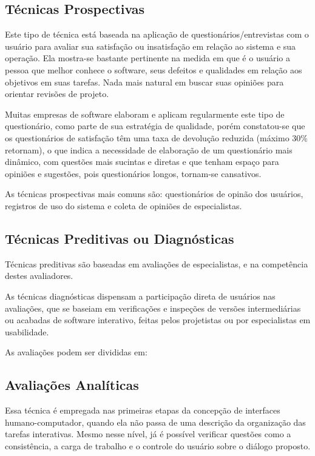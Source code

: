 \subsection{Técnicas Prospectivas}

Este tipo de técnica está baseada na aplicação de questionários/entrevistas com o usuário para avaliar sua satisfação ou insatisfação em relação ao sistema e sua operação. Ela mostra-se bastante pertinente na medida em que é o usuário a pessoa que melhor conhece o software, seus defeitos e qualidades em relação aos objetivos em suas tarefas. Nada mais natural em buscar suas opiniões para orientar revisões de projeto.

Muitas empresas de software elaboram e aplicam regularmente este tipo de questionário, como parte de sua estratégia de qualidade, porém constatou-se que os questionários de satisfação têm uma taxa de devolução reduzida (máximo 30\% retornam), o que indica a necessidade de elaboração de um questionário mais dinâmico, com questões mais sucintas e diretas e que tenham espaço para opiniões e sugestões, pois questionários longos, tornam-se cansativos.
\cite{cybil_apostila}

As técnicas prospectivas mais comuns são: questionários de opinão dos usuários, registros de uso do sistema e coleta de opiniões de especialistas. 

\subsection{Técnicas Preditivas ou Diagnósticas}

Técnicas preditivas são baseadas em avaliações de especialistas, e na competência destes avaliadores. 

As técnicas diagnósticas dispensam a participação direta de usuários nas avaliações, que se baseiam em verificações e inspeções de versões intermediárias ou acabadas de software interativo, feitas pelos projetistas ou por especialistas em usabilidade.
\cite{cybil_apostila}

As avaliações podem ser divididas em: 

\subsection{Avaliações Analíticas}

Essa técnica é empregada nas primeiras etapas da concepção de interfaces humano-computador, quando ela não passa de uma descrição da organização das tarefas interativas. Mesmo nesse nível, já é possível verificar questões como a consistência, a carga de trabalho e o controle do usuário sobre o diálogo proposto. 
\cite{cybil_apostila}

